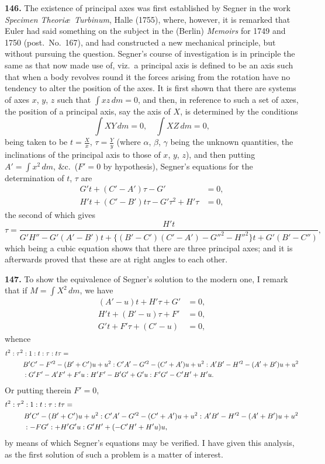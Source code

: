 \documentclass[11pt,a4paper]{article}
\theoremstyle{definition}
\begin{document}
\textbf{146.} The existence of principal axes was first established by Segner in the work \textit{Specimen Theori\ae\ Turbinum}, Halle (1755), where, however, it is remarked that Euler had said something on the subject in the (Berlin) \textit{Memoirs} for 1749 and 1750 (post.\ No.\ 167), and had constructed a new mechanical principle, but without pursuing the question. Segner's course of investigation is in principle the same as that now made use of, viz.\ a principal axis is defined to be an axis such that when a body revolves round it the forces arising from the rotation have no tendency to alter the position of the axes. It is first shown that there are systems of axes $x$, $y$, $z$ such that $\int xz\,dm = 0$, and then, in reference to such a set of axes, the position of a principal axis, say the axis of $X$, is determined by the conditions
\[
\int XY\,dm = 0, \quad \int XZ\,dm = 0,
\]
being taken to be $t = \frac{X}{x}$, $\tau = \frac{Y}{y}$ (where $\alpha$, $\beta$, $\gamma$ being the unknown quantities, the inclinations of the principal axis to those of $x$, $y$, $z$), and then putting $A' = \int x^2\,dm$, \&c.\ ($F' = 0$ by hypothesis), Segner's equations for the determination of $t$, $\tau$ are
\begin{align*}
G't + (C' - A')\tau - G' &= 0, \\
H't + (C' - B')t\tau - G'\tau^2 + H'\tau &= 0,
\end{align*}
the second of which gives
\[
\tau = \frac{H't}{G'H'' - G'(A' - B')t + \{(B' - C')(C' - A') - G''^2 - H''^2\}t + G'(B' - C'')},
\]
which being a cubic equation shows that there are three principal axes; and it is afterwards proved that these are at right angles to each other.

\textbf{147.} To show the equivalence of Segner's solution to the modern one, I remark that if $M = \int X^2\,dm$, we have
\begin{align*}
(A' - u)t + H'\tau + G' &= 0, \\
H't + (B' - u)\tau + F' &= 0, \\
G't + F'\tau + (C' - u) &= 0,
\end{align*}
whence
\begin{align*}
t^2 : \tau^2 : 1 : t : \tau : t\tau &= \\
&\hspace{-2cm} B'C' - F'^2 - (B' + C')u + u^2 : C'A' - G'^2 - (C' + A')u + u^2 : A'B' - H'^2 - (A' + B')u + u^2 \\
&\hspace{-2cm} : G'F' - A'F' + F'u : H'F' - B'G' + G'u : F'G' - C'H' + H'u.
\end{align*}
Or putting therein $F' = 0$,
\begin{align*}
t^2 : \tau^2 : 1 : t : \tau : t\tau &= \\
&\hspace{-2cm} B'C' - (B' + C')u + u^2 : C'A' - G'^2 - (C' + A')u + u^2 : A'B' - H'^2 - (A' + B')u + u^2 \\
&\hspace{-2cm} : -FG' : +H'G'u : G'H' + (-C'H' + H'u)u,
\end{align*}
by means of which Segner's equations may be verified. I have given this analysis, as the first solution of such a problem is a matter of interest.
\end{document}
